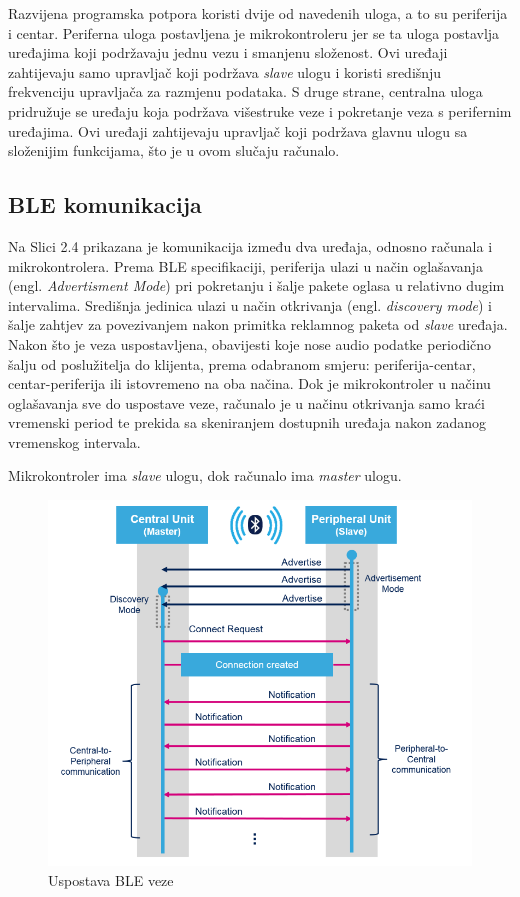 Razvijena programska potpora koristi dvije od navedenih uloga, a to su periferija i centar. Periferna uloga postavljena je mikrokontroleru jer se ta uloga postavlja uređajima koji podržavaju jednu vezu i smanjenu složenost. Ovi uređaji zahtijevaju samo upravljač koji podržava \textit{slave} ulogu i koristi središnju frekvenciju upravljača za razmjenu podataka. S druge strane, centralna uloga pridružuje se uređaju koja podržava višestruke veze i pokretanje veza s perifernim uređajima. Ovi uređaji zahtijevaju upravljač koji podržava glavnu ulogu sa složenijim funkcijama, što je u ovom slučaju računalo.

\subsection{BLE komunikacija}

Na Slici 2.4 prikazana je komunikacija između dva uređaja, odnosno računala i mikrokontrolera. Prema BLE specifikaciji, periferija ulazi u način oglašavanja (engl. \textit{Advertisment Mode}) pri pokretanju i šalje pakete oglasa u relativno dugim intervalima. Središnja jedinica ulazi u način otkrivanja (engl. \textit{discovery mode}) i šalje zahtjev za povezivanjem nakon primitka reklamnog paketa od \textit{slave} uređaja. Nakon što je veza uspostavljena, obavijesti koje nose audio podatke periodično šalju od poslužitelja do klijenta, prema odabranom smjeru: periferija-centar, centar-periferija ili istovremeno na oba načina. Dok je mikrokontroler u načinu oglašavanja sve do uspostave veze, računalo je u načinu otkrivanja samo kraći vremenski period te prekida sa skeniranjem dostupnih uređaja nakon zadanog vremenskog intervala.

Mikrokontroler ima \textit{slave} ulogu, dok računalo ima \textit{master} ulogu. 

\begin{figure}[ht]
	\centering
	\includegraphics[scale=0.7]{imgs/ble_connection_setup}
	\caption{Uspostava BLE veze}
	\label{fig:ble_connection_setup}
\end{figure}


